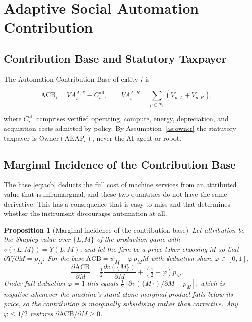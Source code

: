 \documentclass[journal]{IEEEtran}
\theoremstyle{plain}
\newtheorem{proposition}{Proposition}
\theoremstyle{definition}
\newcommand{\ACB}{\mathrm{ACB}}
\newcommand{\AEAP}{\mathrm{AEAP}}
\begin{document}
\section{Adaptive Social Automation Contribution}
\label{sec:sac}

\subsection{Contribution Base and Statutory Taxpayer}

The Automation Contribution Base of entity $i$ is

\begin{equation}
\label{eq:acb}
\ACB_i = VA^{A,R}_i - C^{\mathrm{all}}_i, \qquad VA^{A,R}_i = \!\!\sum_{p\in\mathcal{P}_i}\!\! (V_{p,A}+V_{p,R}),
\end{equation}

where $C^{\mathrm{all}}_i$ comprises verified operating, compute, energy, depreciation, and acquisition costs admitted by policy. By Assumption~\ref{as:owner} the statutory taxpayer is $\mathrm{Owner}(\AEAP_i)$, never the AI agent or robot.

\subsection{Marginal Incidence of the Contribution Base}

The base \eqref{eq:acb} deducts the full cost of machine services from an attributed value that is inframarginal, and these two quantities do not have the same derivative. This has a consequence that is easy to miss and that determines whether the instrument discourages automation at all.

\begin{proposition}[Marginal incidence of the contribution base]
\label{prop:margin}
Let attribution be the Shapley value over $\{L,M\}$ of the production game with $v(\{L,M\})=Y(L,M)$, and let the firm be a price taker choosing $M$ so that $\partial Y/\partial M = p_M$. For the base $\ACB = \psi_M - \varphi\,p_M M$ with deduction share $\varphi\in[0,1]$,
\begin{equation}
\label{eq:margin}
\frac{\partial \ACB}{\partial M} = \tfrac{1}{2}\frac{\partial v(\{M\})}{\partial M} + \left(\tfrac{1}{2}-\varphi\right)p_M .
\end{equation}
Under full deduction $\varphi = 1$ this equals $\tfrac{1}{2}[\partial v(\{M\})/\partial M - p_M]$, which is negative whenever the machine's stand-alone marginal product falls below its price, so the contribution is marginally \emph{subsidising} rather than corrective. Any $\varphi \le 1/2$ restores $\partial \ACB/\partial M \ge 0$.
\end{proposition}
\end{document}

